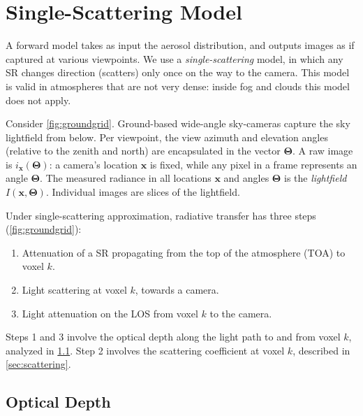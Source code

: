 \documentclass[10pt,letterpaper]{article}
\begin{document}

\section{Single-Scattering Model}
\label{sec:single-scatt-model}

A forward model takes as input the aerosol distribution, and outputs
images as if captured at various viewpoints.  We use a
\emph{single-scattering} model, in which any SR changes direction
(scatters) only once on the way to the camera. This model is valid in
atmospheres that are not very dense: inside fog and clouds this model
does not apply.

Consider \cref{fig:groundgrid}.  Ground-based wide-angle sky-cameras
capture the sky lightfield from below. Per viewpoint, the view azimuth
and elevation angles (relative to the zenith and north) are
encapsulated in the vector ${\bm{\Theta}}$.  A raw image is $i_{\bm
  x}({\bm{\Theta}})$: a camera's location ${\bm x}$ is fixed, while
any pixel in a frame represents an angle ${\bm{\Theta}}$.  The
measured radiance in all locations ${\bm x}$ and angles
${\bm{\Theta}}$ is the {\em lightfield} $I({\bm
  x},{\bm{\Theta}})$. Individual images are slices of the lightfield.

Under single-scattering approximation, radiative transfer has three
steps (\cref{fig:groundgrid}):
\begin{enumerate}
\item Attenuation of a SR propagating from the top of the atmosphere
  (TOA) to voxel $k$.
\item Light scattering at voxel $k$, towards a camera.
\item Light attenuation on the LOS from voxel $k$ to the camera.
\end{enumerate}

Steps 1 and 3 involve the optical depth along the light path to and
from voxel $k$, analyzed in \cref{sec:optical-depth}.  Step 2 involves
the scattering coefficient at voxel $k$, described in
\cref{sec:scattering}.


\subsection{Optical Depth}
\label{sec:optical-depth}
\end{document}
